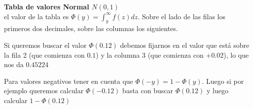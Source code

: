 \documentclass[]{book}
\theoremstyle{plain}
\theoremstyle{definition}
\theoremstyle{definition} %
\begin{document}

\newpage
\newpage


\textbf{Tabla de valores Normal \(N(0,1)\)}\\
el valor de la tabla es \(\Phi(y) = \int^{\infty}_{y} f(z)dz\). Sobre el
lado de las filas los primeros dos decimales, sobre las columnas los
siguientes.

Si queremos buscar el valor \(\Phi(0.12)\) debemos fijarnos en el valor
que está sobre la fila 2 (que comienza con \(0.1\)) y la columna 3 (que
comienza con \(+0.02\)), lo que nos da \(0.45224\)

Para valores negativos tener en cuenta que \(\Phi(-y) = 1-\Phi(y)\).
Luego si por ejemplo queremos calcular \(\Phi(-0.12)\) basta con buscar
\(\Phi(0.12)\) y luego calcular \(1-\Phi(0.12)\)\\
\end{document}
